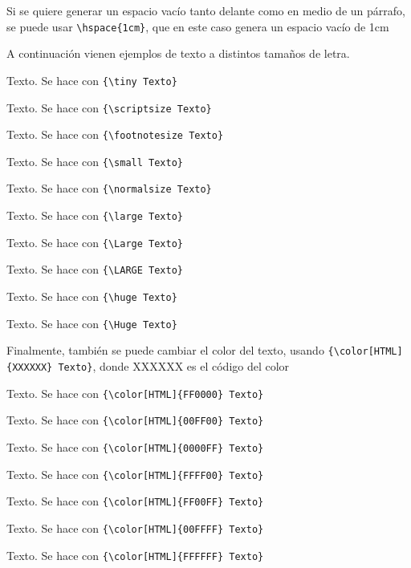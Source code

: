 Si se quiere generar un espacio vacío \hspace{1cm} tanto delante como en medio de un párrafo, se puede usar \verb!\hspace{1cm}!, que en este caso genera un espacio vacío de 1cm

A continuación vienen ejemplos de texto a distintos tamaños de letra. 

{\tiny Texto. Se hace con \verb!{\tiny Texto}!}

{\scriptsize Texto. Se hace con \verb!{\scriptsize Texto}!}

{\footnotesize Texto. Se hace con \verb!{\footnotesize Texto}!}

{\small Texto. Se hace con \verb!{\small Texto}!}

{\normalsize Texto. Se hace con \verb!{\normalsize Texto}!}

{\large Texto. Se hace con \verb!{\large Texto}!}

{\Large Texto. Se hace con \verb!{\Large Texto}!}

{\LARGE Texto. Se hace con \verb!{\LARGE Texto}!}

{\huge Texto. Se hace con \verb!{\huge Texto}!}

{\Huge Texto. Se hace con \verb!{\Huge Texto}!}

Finalmente, también se puede cambiar el color del texto, usando \verb!{\color[HTML]{XXXXXX} Texto}!, donde XXXXXX es el código del color

{\color[HTML]{FF0000} Texto. Se hace con \verb!{\color[HTML]{FF0000} Texto}!}

{\color[HTML]{00FF00} Texto. Se hace con \verb!{\color[HTML]{00FF00} Texto}!}

{\color[HTML]{0000FF} Texto. Se hace con \verb!{\color[HTML]{0000FF} Texto}!}

{\color[HTML]{FFFF00} Texto. Se hace con \verb!{\color[HTML]{FFFF00} Texto}!}

{\color[HTML]{FF00FF} Texto. Se hace con \verb!{\color[HTML]{FF00FF} Texto}!}

{\color[HTML]{00FFFF} Texto. Se hace con \verb!{\color[HTML]{00FFFF} Texto}!}

{\color[HTML]{FFFFFF} Texto. Se hace con \verb!{\color[HTML]{FFFFFF} Texto}!}